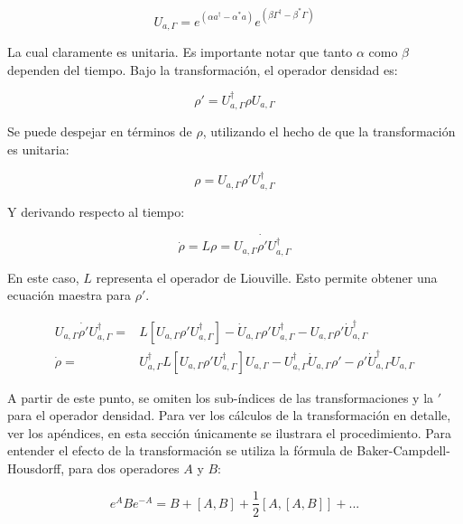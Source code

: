 \documentclass[a4paper,10pt]{report}
\begin{document}
\begin{equation}
U_{a,\Gamma} = e^{(\alpha a^\dagger - \alpha^*a)}e^{(\beta \Gamma^\dagger - \beta^*\Gamma)}
\end{equation}

La cual claramente es unitaria. Es importante notar que tanto $\alpha$ como $\beta$ dependen del tiempo. Bajo la transformación, el operador densidad es:

\begin{equation}
\rho' = U_{a,\Gamma}^\dagger \rho U_{a,\Gamma}
\end{equation}

Se puede despejar en términos de $\rho$, utilizando el hecho de que la transformación es unitaria:

\begin{equation}
\rho = U_{a,\Gamma} \rho' U_{a,\Gamma}^\dagger
\end{equation}

Y derivando respecto al tiempo:

\begin{equation}
\dot{\rho} = L\rho = \dot{U_{a,\Gamma} \rho' U_{a,\Gamma}^\dagger}
\end{equation}

En este caso, $L$ representa el operador de Liouville. Esto permite obtener una ecuación maestra para $\rho'$. 

\begin{align}
 U_{a,\Gamma} \dot{\rho'} U_{a,\Gamma}^\dagger =& L[U_{a,\Gamma} \rho' U_{a,\Gamma}^\dagger] - \dot{U}_{a,\Gamma}\rho'U_{a,\Gamma}^\dagger -U_{a,\Gamma} \rho' \dot{U}_{a,\Gamma}^\dagger\\
\dot{\rho} =& U_{a,\Gamma}^\dagger L[U_{a,\Gamma} \rho' U_{a,\Gamma}^\dagger]U_{a,\Gamma}-U_{a,\Gamma}^\dagger\dot{U}_{a,\Gamma}\rho'-\rho'\dot{U}_{a,\Gamma}^\dagger U_{a,\Gamma}
\end{align}

A partir de este punto, se omiten los sub-índices de las transformaciones y la $'$ para el operador densidad. Para ver los cálculos de la transformación en detalle, ver los apéndices, en esta sección únicamente se ilustrara el procedimiento. Para entender el efecto de la transformación se utiliza la fórmula de Baker-Campdell-Housdorff\cite{SakuraiQM}, para dos operadores $A$ y $B$:

\begin{equation}
e^{A} B e^{-A} = B + [A,B] + \frac{1}{2}[A,[A,B]] + ...
\end{equation} 
 
\end{document}
